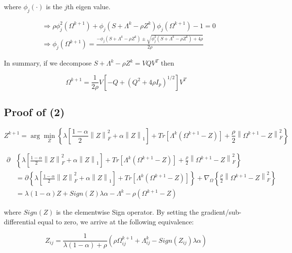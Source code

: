 \documentclass[12pt,]{book}
\theoremstyle{definition}
\theoremstyle{definition}
\theoremstyle{definition}
\theoremstyle{remark}
\begin{document}
where \(\phi_{j}(\cdot)\) is the \(j\)th eigen value.

\begin{align*}
  &\Rightarrow \rho\phi_{j}^{2}(\Omega^{k + 1}) + \phi_{j}\left( S + \Lambda^{k} - \rho Z^{k} \right)\phi_{j}(\Omega^{k + 1}) - 1 = 0 \\
  &\Rightarrow \phi_{j}(\Omega^{k + 1}) = \frac{-\phi_{j}(S + \Lambda^{k} - \rho Z^{k}) \pm \sqrt{\phi_{j}^{2}(S + \Lambda^{k} - \rho Z^{k}) + 4\rho}}{2\rho}
\end{align*}

In summary, if we decompose \(S + \Lambda^{k} - \rho Z^{k} = VQV^{T}\)
then

\[ \Omega^{k + 1} = \frac{1}{2\rho}V\left[ -Q + (Q^{2} + 4\rho I_{p})^{1/2}\right] V^{T} \]

\vspace{1cm}

\hypertarget{proof-of-2}{%
\subsection{Proof of (2)}\label{proof-of-2}}

\[ Z^{k + 1} = \arg\min_{Z}\left\{ \lambda\left[ \frac{1 - \alpha}{2}\left\| Z \right\|_{F}^{2} + \alpha\left\| Z \right\|_{1} \right] + Tr\left[\Lambda^{k}\left(\Omega^{k + 1} - Z\right)\right] + \frac{\rho}{2}\left\| \Omega^{k + 1} - Z \right\|_{F}^{2} \right\} \]

\begin{align*}
  \partial&\left\{ \lambda\left[ \frac{1 - \alpha}{2}\left\| Z \right\|_{F}^{2} + \alpha\left\| Z \right\|_{1} \right] + Tr\left[\Lambda^{k}\left(\Omega^{k + 1} - Z\right)\right] + \frac{\rho}{2}\left\| \Omega^{k + 1} - Z \right\|_{F}^{2} \right\} \\
  &= \partial\left\{ \lambda\left[ \frac{1 - \alpha}{2}\left\| Z \right\|_{F}^{2} + \alpha\left\| Z \right\|_{1} \right] + Tr\left[\Lambda^{k}\left(\Omega^{k + 1} - Z\right)\right]\right\} + \nabla_{\Omega}\left\{\frac{\rho}{2}\left\| \Omega^{k + 1} - Z \right\|_{F}^{2} \right\} \\
  &= \lambda(1 - \alpha)Z + Sign(Z)\lambda\alpha - \Lambda^{k} - \rho\left( \Omega^{k + 1} - Z \right)
\end{align*}

where \(Sign(Z)\) is the elementwise Sign operator. By setting the
gradient/sub-differential equal to zero, we arrive at the following
equivalence:

\[ Z_{ij} = \frac{1}{\lambda(1 - \alpha) + \rho}\left( \rho \Omega_{ij}^{k + 1} + \Lambda_{ij}^{k} - Sign(Z_{ij})\lambda\alpha \right) \]
\end{document}

